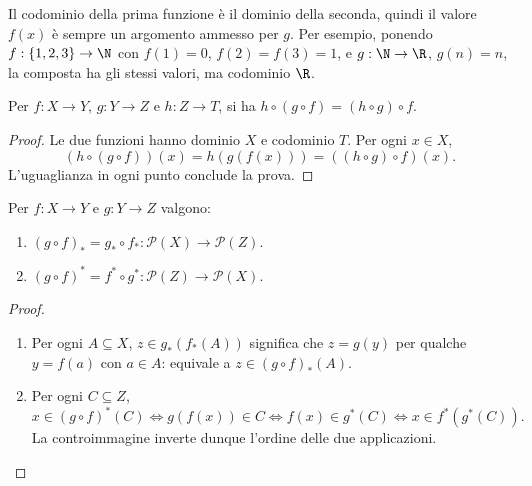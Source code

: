 Il codominio della prima funzione è il dominio della seconda, quindi il valore $f(x)$ è sempre un argomento ammesso per $g$. Per esempio, ponendo $f:\{1,2,3\}\to\N$ con $f(1)=0$, $f(2)=f(3)=1$, e $g:\N\to\R$, $g(n)=n$, la composta ha gli stessi valori, ma codominio $\R$.

\begin{proposizione}[Associatività]
Per $f:X\to Y$, $g:Y\to Z$ e $h:Z\to T$, si ha $h\circ(g\circ f)=(h\circ g)\circ f$.
\end{proposizione}
\begin{proof}
Le due funzioni hanno dominio $X$ e codominio $T$. Per ogni $x\in X$,
\[
(h\circ(g\circ f))(x)=h(g(f(x)))=((h\circ g)\circ f)(x).
\]
L'uguaglianza in ogni punto conclude la prova.
\end{proof}

\begin{proposizione}
Per $f:X\to Y$ e $g:Y\to Z$ valgono:
\begin{enumerate}[label=\arabic*.]
\item $(g\circ f)_*=g_*\circ f_*:\mathcal P(X)\to\mathcal P(Z)$.
\item $(g\circ f)^*=f^*\circ g^*:\mathcal P(Z)\to\mathcal P(X)$.
\end{enumerate}
\end{proposizione}
\begin{proof}
\begin{enumerate}[label=\arabic*.]
\item Per ogni $A\subseteq X$, $z\in g_*(f_*(A))$ significa che $z=g(y)$ per qualche $y=f(a)$ con $a\in A$: equivale a $z\in(g\circ f)_*(A)$.
\item Per ogni $C\subseteq Z$,
\[
x\in(g\circ f)^*(C)\iff g(f(x))\in C
\iff f(x)\in g^*(C)\iff x\in f^*(g^*(C)).
\]
La controimmagine inverte dunque l'ordine delle due applicazioni.
\end{enumerate}
\end{proof}

